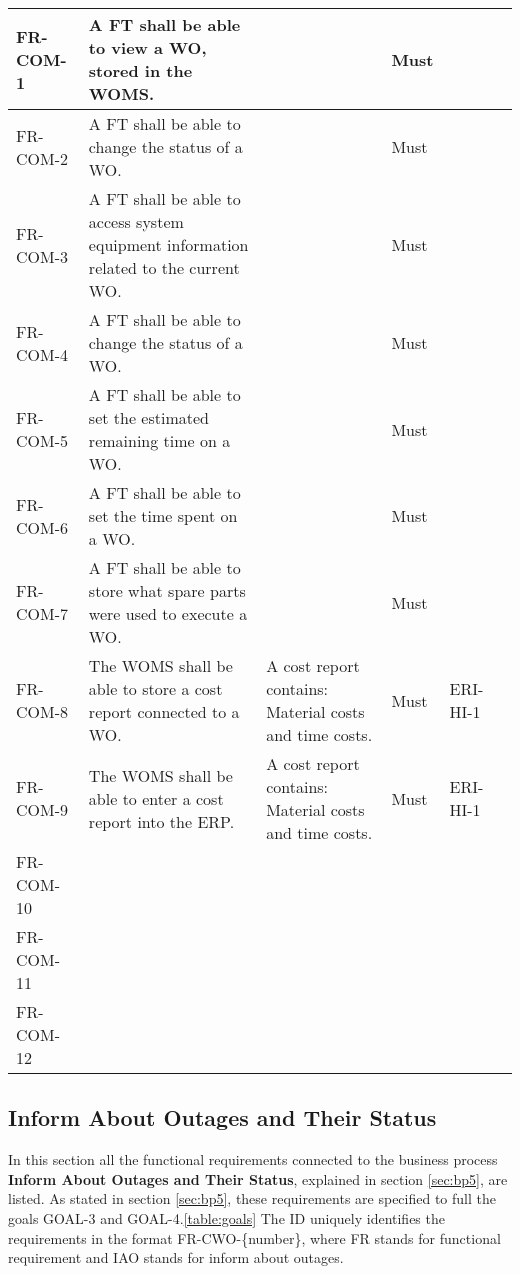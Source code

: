 \begin{center}
\begin{longtable}{|l|p{4cm}|p{4cm}|l|l|l|}
FR-COM-1 & A FT shall be able to view a WO, stored in the WOMS. & & Must & \\ 
\hline
FR-COM-2 & A FT shall be able to change the status of a WO. & & Must & \\ 
\hline
FR-COM-3 & A FT shall be able to access system equipment information related to the current WO. & & Must & \\ 
\hline
FR-COM-4 & A FT shall be able to change the status of a WO. & & Must & \\ 
\hline
FR-COM-5 & A FT shall be able to set the estimated remaining time on a WO. & & Must & \\ 
\hline
FR-COM-6 & A FT shall be able to set the time spent on a WO. & & Must & \\ 
\hline
FR-COM-7 & A FT shall be able to store what spare parts were used to execute a WO. & & Must & \\ 
\hline
FR-COM-8 & The WOMS shall be able to store a cost report connected to a WO. &A cost report contains: Material costs and time costs. & Must & ERI-HI-1 \\ 
\hline
FR-COM-9 & The WOMS shall be able to enter a cost report into the ERP. &A cost report contains: Material costs and time costs. & Must & ERI-HI-1 \\ 
\hline
FR-COM-10& & & & \\
\hline
FR-COM-11& & & & \\
\hline
FR-COM-12& & & & \\
\hline
\end{longtable}
\end{center}


\subsection{Inform About Outages and Their Status}
\label{sub:inform_about_outages}
In this section all the functional requirements connected to the business process \textbf{Inform About Outages and Their Status}, explained in section \ref{sec:bp5}, are listed. As stated in section \ref{sec:bp5}, these requirements are specified to full the goals GOAL-3 and GOAL-4.\ref{table:goals} The ID uniquely identifies the requirements in the format FR-CWO-\{number\}, where  FR stands for functional requirement and IAO stands for inform about outages. 


